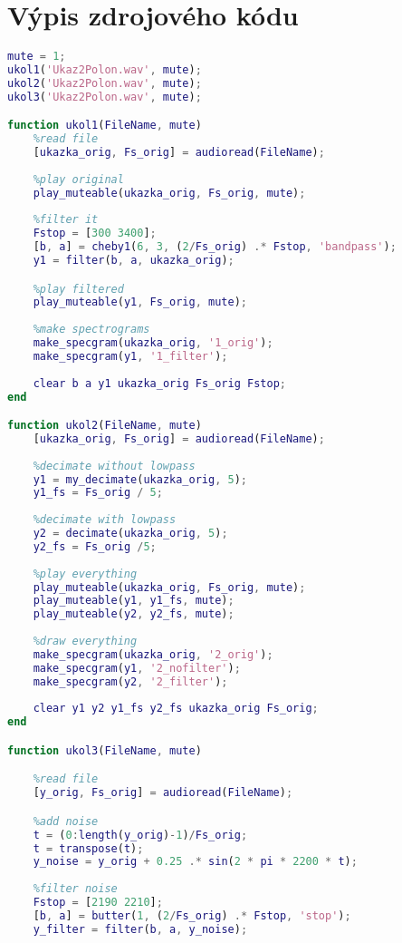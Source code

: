 \documentclass[11pt, a4paper]{article}
\begin{document}
    \section{Výpis zdrojového kódu}

\begin{lstlisting}[language=matlab, frame=single] 
mute = 1;
ukol1('Ukaz2Polon.wav', mute);
ukol2('Ukaz2Polon.wav', mute);
ukol3('Ukaz2Polon.wav', mute);

function ukol1(FileName, mute)
    %read file
    [ukazka_orig, Fs_orig] = audioread(FileName);
    
    %play original
    play_muteable(ukazka_orig, Fs_orig, mute);
    
    %filter it
    Fstop = [300 3400];
    [b, a] = cheby1(6, 3, (2/Fs_orig) .* Fstop, 'bandpass');
    y1 = filter(b, a, ukazka_orig);

    %play filtered
    play_muteable(y1, Fs_orig, mute);
    
    %make spectrograms
    make_specgram(ukazka_orig, '1_orig');
    make_specgram(y1, '1_filter');
    
    clear b a y1 ukazka_orig Fs_orig Fstop;
end

function ukol2(FileName, mute)
    [ukazka_orig, Fs_orig] = audioread(FileName);
    
    %decimate without lowpass
    y1 = my_decimate(ukazka_orig, 5);
    y1_fs = Fs_orig / 5;
    
    %decimate with lowpass
    y2 = decimate(ukazka_orig, 5);
    y2_fs = Fs_orig /5;
    
    %play everything
    play_muteable(ukazka_orig, Fs_orig, mute);
    play_muteable(y1, y1_fs, mute);
    play_muteable(y2, y2_fs, mute);
    
    %draw everything
    make_specgram(ukazka_orig, '2_orig');
    make_specgram(y1, '2_nofilter');
    make_specgram(y2, '2_filter');
    
    clear y1 y2 y1_fs y2_fs ukazka_orig Fs_orig;
end

function ukol3(FileName, mute)

    %read file
    [y_orig, Fs_orig] = audioread(FileName);

    %add noise
    t = (0:length(y_orig)-1)/Fs_orig;
    t = transpose(t);
    y_noise = y_orig + 0.25 .* sin(2 * pi * 2200 * t);
    
    %filter noise
    Fstop = [2190 2210];
    [b, a] = butter(1, (2/Fs_orig) .* Fstop, 'stop');
    y_filter = filter(b, a, y_noise);
    

\end{lstlisting}
\end{document}
